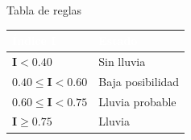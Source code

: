 \documentclass[11pt,a4paper]{article}
\renewcommand{\arraystretch}{1.08}
\begin{document}
\centerline{Tabla de reglas}
\begin{table}[h!]
\centering
{}
\setlength{\arrayrulewidth}{0.75pt}
\renewcommand{\arraystretch}{1.25}
\begin{tabular}{|l|l|}
\hline
\rowcolor{headerblue}
\textbf{\textcolor{white}{Índice I}} & \textbf{\textcolor{white}{Estado}} \\ \hline
\rowcolor{rowlight}
$\mathbf{I < 0.40}$ & Sin lluvia \\ \hline
$\mathbf{0.40 \le I < 0.60}$ & Baja posibilidad \\ \hline
\rowcolor{rowlight}
$\mathbf{0.60 \le I < 0.75}$ & Lluvia probable \\ \hline
$\mathbf{I \ge 0.75}$ & Lluvia \\ \hline
\end{tabular}
\end{table}
\end{document}
